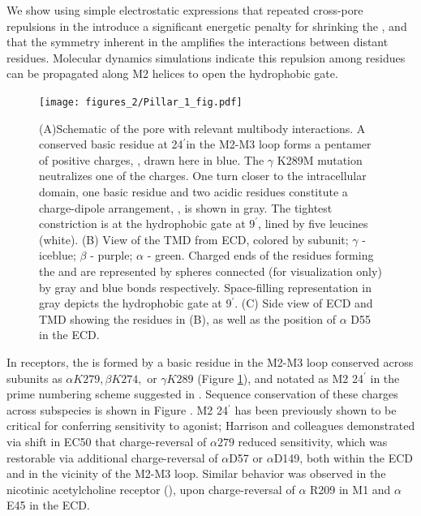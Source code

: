 \documentclass[9pt,twocolumn,twoside,lineno]{pnas-new}
\begin{document}
We show using simple electrostatic expressions that repeated cross-pore repulsions in the \fivering introduce a significant energetic penalty for shrinking the \fiveringnos,  and that the symmetry inherent in the \fivering amplifies the interactions between distant residues.  Molecular dynamics simulations indicate this repulsion among \fivering residues can be  propagated along M2 helices to open the hydrophobic gate.   
\begin{figure}[t]
\centering
\texttt{[image: figures\_2/Pillar\_1\_fig.pdf]}
\caption{(A)Schematic of the \GABAA pore with relevant multibody interactions.   A conserved basic residue at 24$^{\prime}$in the M2-M3 loop forms a pentamer of positive charges, \fiveringnos, drawn here in blue. %
The $\gamma$ K289M mutation neutralizes one of the charges. One turn closer to the intracellular domain,  one basic residue and two acidic residues constitute a charge-dipole arrangement, \triadns, is shown in gray.  The tightest constriction is at the hydrophobic gate at $9^{\prime}$, lined by five leucines (white).   (B) View of the TMD from ECD,  colored by subunit; $\gamma$ - iceblue; $\beta$ - purple; $\alpha$ - green. Charged ends of the residues forming the \fivering and \triad are represented by spheres connected (for visualization only) by gray and blue bonds respectively. Space-filling representation in gray depicts the hydrophobic gate at 9$^{\prime}$. (C) Side view of ECD and TMD showing the residues in (B), as well as the position of $\alpha$ D55 in the ECD.
\label{fig:fig1}
}
\end{figure}
In \GABAA receptors, the \fivering is formed by a basic residue in the M2-M3 loop conserved across \GABAA subunits as $\alpha K279, \beta K274,$ or $\gamma K289$ (Figure \ref{fig:fig1}), and notated as M2 24$^{\prime}$ in the prime numbering scheme suggested in \cite{Jaiteh2016}.  Sequence conservation of these charges across \GABAA subspecies is shown in Figure \sfigAlignment. 
M2 24$^{\prime}$ has been previously shown to be critical for conferring sensitivity to agonist; Harrison and colleagues\cite{Kash2003} demonstrated via shift in EC50 that charge-reversal of $\alpha279$ reduced sensitivity, which was restorable via additional charge-reversal of $\alpha$D57 or $\alpha$D149, both within the ECD and in the vicinity of the M2-M3 loop.  Similar behavior was observed in the nicotinic acetylcholine receptor (\nachr), upon charge-reversal of  $\alpha$ R209 in M1 and $\alpha$ E45 in the ECD.\cite{Lee2005}  
\end{document}
